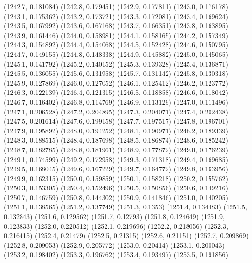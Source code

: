 {					(1242.7, 0.181084)
					(1242.8, 0.179451)
					(1242.9, 0.177811)
					(1243.0, 0.176178)
					(1243.1, 0.175362)
					(1243.2, 0.173721)
					(1243.3, 0.172081)
					(1243.4, 0.169624)
					(1243.5, 0.167992)
					(1243.6, 0.167168)
					(1243.7, 0.166351)
					(1243.8, 0.163895)
					(1243.9, 0.161446)
					(1244.0, 0.158981)
					(1244.1, 0.158165)
					(1244.2, 0.157349)
					(1244.3, 0.154892)
					(1244.4, 0.154068)
					(1244.5, 0.152428)
					(1244.6, 0.150795)
					(1244.7, 0.149155)
					(1244.8, 0.148338)
					(1244.9, 0.145882)
					(1245.0, 0.145065)
					(1245.1, 0.141792)
					(1245.2, 0.140152)
					(1245.3, 0.139328)
					(1245.4, 0.136871)
					(1245.5, 0.136055)
					(1245.6, 0.131958)
					(1245.7, 0.131142)
					(1245.8, 0.130318)
					(1245.9, 0.127869)
					(1246.0, 0.127052)
					(1246.1, 0.125412)
					(1246.2, 0.123772)
					(1246.3, 0.122139)
					(1246.4, 0.121315)
					(1246.5, 0.118858)
					(1246.6, 0.118042)
					(1246.7, 0.116402)
					(1246.8, 0.114769)
					(1246.9, 0.113129)
					(1247.0, 0.111496)
					(1247.1, 0.206528)
					(1247.2, 0.204895)
					(1247.3, 0.204071)
					(1247.4, 0.202438)
					(1247.5, 0.201614)
					(1247.6, 0.199158)
					(1247.7, 0.197517)
					(1247.8, 0.196701)
					(1247.9, 0.195892)
					(1248.0, 0.194252)
					(1248.1, 0.190971)
					(1248.2, 0.189339)
					(1248.3, 0.188515)
					(1248.4, 0.187698)
					(1248.5, 0.186874)
					(1248.6, 0.185242)
					(1248.7, 0.182785)
					(1248.8, 0.181961)
					(1248.9, 0.177872)
					(1249.0, 0.176239)
					(1249.1, 0.174599)
					(1249.2, 0.172958)
					(1249.3, 0.171318)
					(1249.4, 0.169685)
					(1249.5, 0.168045)
					(1249.6, 0.167229)
					(1249.7, 0.164772)
					(1249.8, 0.163956)
					(1249.9, 0.162315)
					(1250.0, 0.159859)
					(1250.1, 0.158218)
					(1250.2, 0.155762)
					(1250.3, 0.153305)
					(1250.4, 0.152496)
					(1250.5, 0.150856)
					(1250.6, 0.149216)
					(1250.7, 0.146759)
					(1250.8, 0.144302)
					(1250.9, 0.141846)
					(1251.0, 0.140205)
					(1251.1, 0.138565)
					(1251.2, 0.137749)
					(1251.3, 0.1353)
					(1251.4, 0.134483)
					(1251.5, 0.132843)
					(1251.6, 0.129562)
					(1251.7, 0.12793)
					(1251.8, 0.124649)
					(1251.9, 0.123833)
					(1252.0, 0.220512)
					(1252.1, 0.219696)
					(1252.2, 0.218056)
					(1252.3, 0.216415)
					(1252.4, 0.21479)
					(1252.5, 0.21315)
					(1252.6, 0.21151)
					(1252.7, 0.209869)
					(1252.8, 0.209053)
					(1252.9, 0.205772)
					(1253.0, 0.20414)
					(1253.1, 0.200043)
					(1253.2, 0.198402)
					(1253.3, 0.196762)
					(1253.4, 0.193497)
					(1253.5, 0.191856)
}
